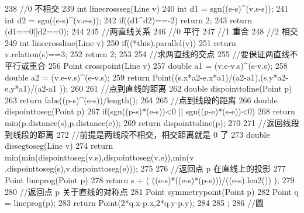 \documentclass[11pt]{article}
\begin{document}
\begin{Code}
{238       //0 不相交
239       int linecrossseg(Line v){
240           int d1 = sgn((e-s)^(v.s-s));
241           int d2 = sgn((e-s)^(v.e-s));
242           if((d1^d2)==-2) return 2;
243           return (d1==0||d2==0);
244       }
245       //两直线关系
246       //0 平行
247       //1 重合
248       //2 相交
249       int linecrossline(Line v){
250           if((*this).parallel(v))
251               return v.relation(s)==3;
252           return 2;
253       }
254       //求两直线的交点
255       //要保证两直线不平行或重合
256       Point crosspoint(Line v){
257           double a1 = (v.e-v.s)^(s-v.s);
258           double a2 = (v.e-v.s)^(e-v.s);
259           return Point((s.x*a2-e.x*a1)/(a2-a1),(s.y*a2-e.y*a1)/(a2-a1
                 ));
260       }
261       //点到直线的距离
262       double dispointtoline(Point p){
263           return fabs((p-s)^(e-s))/length();
264       }
265       //点到线段的距离
266       double dispointtoseg(Point p){
267           if(sgn((p-s)*(e-s))<0 || sgn((p-e)*(s-e))<0)
268               return min(p.distance(s),p.distance(e));
269           return dispointtoline(p);
270       }
271       //返回线段到线段的距离
272       //前提是两线段不相交，相交距离就是 0 了
273       double dissegtoseg(Line v){
274           return min(min(dispointtoseg(v.s),dispointtoseg(v.e)),min(v
                 .dispointtoseg(s),v.dispointtoseg(e)));
275       }
276       //返回点 p 在直线上的投影
277       Point lineprog(Point p){
278           return s + ( ((e-s)*((e-s)*(p-s)))/((e-s).len2()) );
279       }
280       //返回点 p 关于直线的对称点
281       Point symmetrypoint(Point p){
282           Point q = lineprog(p);
283           return Point(2*q.x-p.x,2*q.y-p.y);
284       }
285 };
286 //圆



\end{Code}
\end{document}
